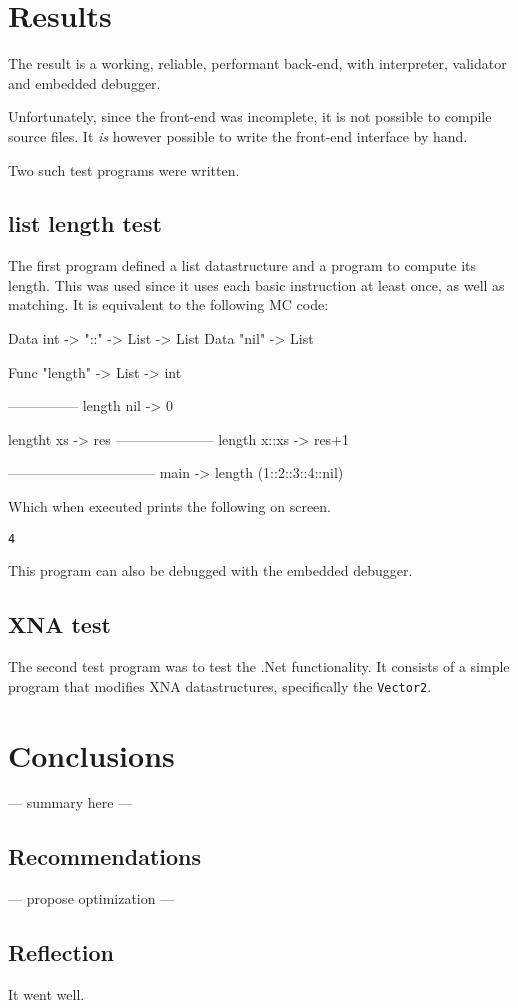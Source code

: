 \section{Results}
The result is a working, reliable, performant back-end, with interpreter, validator and embedded debugger.

Unfortunately, since the front-end was incomplete, it is not possible to compile source files.
It \textit{is} however possible to write the front-end interface by hand.

Two such test programs were written.

\subsection{list length test}
The first program defined a list datastructure and a program to compute its length.
This was used since it uses each basic instruction at least once, as well as matching.
It is equivalent to the following MC code:

\begin{MC}
Data int -> "::" -> List -> List
Data "nil" -> List

Func "length" -> List -> int

---------------
length nil -> 0

lengtht xs -> res
---------------------
length x::xs -> res+1

--------------------------------
main -> length (1::2::3::4::nil)
\end{MC}

Which when executed prints the following on screen.

\begin{lstlisting}
4
\end{lstlisting}

This program can also be debugged with the embedded debugger.

\subsection{XNA test}

The second test program was to test the .Net functionality.
It consists of a simple program that modifies XNA datastructures, specifically the \verb|Vector2|.


\section{Conclusions}
--- summary here ---
\subsection{Recommendations}
--- propose optimization ---
\subsection{Reflection}
It went well.
